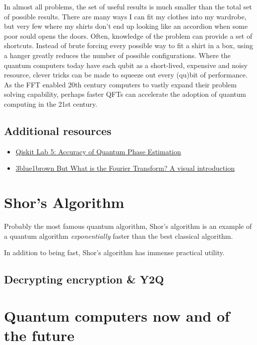 \documentclass{book}
\begin{document}
In almost all problems, the set of useful results is much smaller than the total set of possible results. There are many ways I can fit my clothes into my wardrobe, but very few where my shirts don't end up looking like an accordion when some poor sould opens the doors. Often, knowledge of the problem can provide a set of shortcuts. Instead of brute forcing every possible way to fit a shirt in a box, using a hanger greatly reduces the number of possible configurations. Where the quantum computers today have each qubit as a short-lived, expensive and noisy resource, clever tricks can be made to squeeze out every (qu)bit of performance. As the FFT enabled 20th century computers to vastly expand their problem solving capability, perhaps faster QFTs can accelerate the adoption of quantum computing in the 21st century.  


\section{Additional resources}
\begin{itemize}
    \item \href{https://learn.qiskit.org/course/ch-labs/lab-5-accuracy-of-quantum-phase-estimation}{Qiskit Lab 5: Accuracy of Quantum Phase Estimation}

    \item \href{https://www.3blue1brown.com/lessons/fourier-transforms}{3blue1brown But What is the Fourier Transform? A visual introduction}
\end{itemize}

\chapter{Shor's Algorithm}

Probably the most famous quantum algorithm, Shor's algorithm is an example of a quantum algorithm \textit{exponentially} faster than the best classical algorithm. 

In addition to being fast, Shor's algorithm has immense practical utility. 

\section{Decrypting encryption \& Y2Q}

\chapter{Quantum computers now and of the future}
\end{document}
